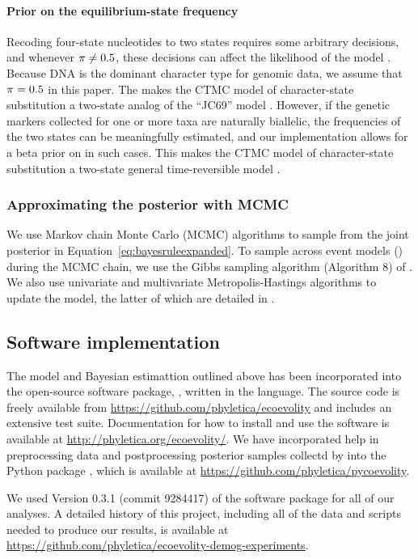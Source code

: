 \paragraph{Prior on the equilibrium-state frequency}
Recoding four-state nucleotides to two states requires some arbitrary
decisions, and whenever $\pi_{} \neq 0.5$, these decisions can affect
the likelihood of the model \citep{Oaks2018ecoevolity}.
Because DNA is the dominant character type for genomic data, we assume that
$\pi_{} = 0.5$ in this paper.
The makes the CTMC model of character-state substitution a two-state analog of
the ``JC69'' model \citep{JC1969}.
However, if the genetic markers collected for one or more taxa are  naturally
biallelic, the frequencies of the two states can be meaningfully estimated, and
our implementation allows for a beta prior on \gfreq in such cases.
This makes the CTMC model of character-state substitution a two-state general
time-reversible model \citep{Tavare1986}.

\subsubsection{Approximating the posterior with MCMC}

We use Markov chain Monte Carlo (MCMC) algorithms to sample from the joint
posterior in Equation~\ref{eq:bayesruleexpanded}.
To sample across event models (\etimesets) during the MCMC chain, we use the
Gibbs sampling algorithm (Algorithm 8) of \citet{Neal2000}.
We also use univariate and multivariate Metropolis-Hastings algorithms
\citep{Metropolis1953,Hastings1970} to update the model,
the latter of which are detailed in \citet{Oaks2018ecoevolity}.

\subsection{Software implementation}
The model and Bayesian estimattion outlined above has been incorporated into
the open-source software package, \ecoevolity, written in the \cpp language.
The source code is freely available from
\url{https://github.com/phyletica/ecoevolity} and
includes an extensive test suite.
Documentation for how to install and use the software is available at
\url{http://phyletica.org/ecoevolity/}.
We have incorporated help in preprocessing data and postprocessing posterior
samples collectd by \ecoevolity into the Python package \pycoevolity, which is
available at
\url{https://github.com/phyletica/pycoevolity}.

We used Version 0.3.1 
(commit 9284417)
of the \ecoevolity software package for all of our analyses.
A detailed history of this project, including all of the data and scripts
needed to produce our results, is available at
\url{https://github.com/phyletica/ecoevolity-demog-experiments}.

